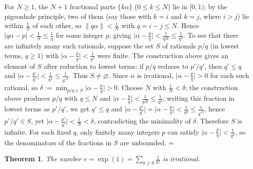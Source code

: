 \documentclass[11pt]{article}
\makeatletter
\theoremstyle{ntstyle}
\newtheorem{theorem}{Theorem}[subsection]
\let\nt@closedisplay\]
\def\nt@guardedclose{\@ifnextchar\par{\nt@closeafterpar}{\@ifnextchar\end{\postdisplaypenalty\@M\nt@closedisplay}{\nt@closedisplay}}}
\def\nt@closeafterpar\par{\@ifnextchar\par{\nt@closeafterpar}{\@ifnextchar\end{\postdisplaypenalty\@M\nt@closedisplay\par}{\nt@closedisplay\par}}}
\renewenvironment{proof}[1][\proofname]{\par
  \pushQED{\qed}\normalfont\topsep\medskipamount\edef\nt@afterproof{\@endparpenalty=\the\@endparpenalty\relax}\@beginparpenalty\@M\@endparpenalty\@M\let\]\nt@guardedclose\trivlist\item[]\textit{#1\@addpunct{.}} \ignorespaces}{\ifvmode\addpenalty\@M\fi\popQED\nt@afterproof\endtrivlist\@endpefalse}
\makeatother
\begin{document}
\begin{proof} For $N\ge1$, the $N+1$ fractional parts
	$\{k\alpha\}$ ($0\le k\le N$) lie in $[0,1)$; by the pigeonhole principle, two of
	them (say those with $k=i$ and $k=j$, where $i>j$) lie within $\tfrac{1}{N}$ of each other, so $\lVert q\alpha\rVert <
		\tfrac{1}{N}$ with $q = i-j\le N$. Hence $|q\alpha - p| <
		\tfrac{1}{N}\le\tfrac{1}{q}$ for some integer $p$, giving $\big|\alpha -
		\tfrac{p}{q}\big| < \tfrac{1}{qN}\le\tfrac{1}{q^2}$.
			To see that there are infinitely many such rationals, suppose the set $S$ of rationals $p/q$ (in
			lowest terms, $q\ge1$) with $\big|\alpha-\tfrac{p}{q}\big|<\tfrac{1}{q^2}$ were finite.
			The construction above gives an element of $S$ after reduction to lowest terms: if $p/q$
			reduces to $p'/q'$, then $q'\le q$ and
			$\big|\alpha-\tfrac{p'}{q'}\big|<\tfrac{1}{q^2}\le\tfrac{1}{q'^2}$.
			Thus $S\neq\varnothing$. Since $\alpha$ is irrational, $\big|\alpha-\tfrac{p}{q}\big|>0$ for
			each such rational, so $\delta:=\min_{p/q\in S}\big|\alpha-\tfrac{p}{q}\big|>0$.
			Choose $N$ with $\tfrac{1}{N}<\delta$; the construction above produces $p/q$ with $q\le N$ and
			$\big|\alpha-\tfrac{p}{q}\big|<\tfrac{1}{qN}\le\tfrac{1}{q^2}$; writing this fraction in lowest
			terms as $p'/q'$, we get $q'\le q$ and
	$\big|\alpha-\tfrac{p'}{q'}\big|=\big|\alpha-\tfrac{p}{q}\big|<\tfrac{1}{q^{2}}\le\tfrac{1}{q'^{2}}$,
	hence $p'/q'\in S$, yet
	$\big|\alpha-\tfrac{p'}{q'}\big|<\tfrac{1}{N}<\delta$, contradicting
	the minimality of $\delta$. Therefore $S$ is infinite. For each fixed
	$q$, only finitely many integers $p$ can satisfy
	$\big|\alpha-\tfrac{p}{q}\big|<\tfrac{1}{q^2}$, so the denominators of
	the fractions in $S$ are unbounded.
\end{proof}
\begin{theorem}\label{thm:10.1.2} The number
	$e=\exp(1)=\sum_{k\ge0}\tfrac{1}{k!}$ is irrational.
\end{theorem}
\end{document}
